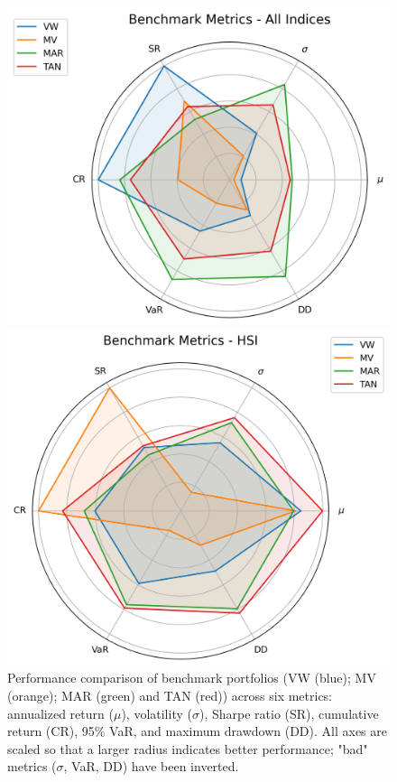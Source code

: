 \begin{figure}[H]
\begin{center}
\begin{minipage}{0.48\textwidth}
  \centering
  \includegraphics[width=\textwidth]{images/40_1.png}
\end{minipage}
\hfill
\begin{minipage}{0.48\textwidth}
  \centering
  \includegraphics[width=\textwidth]{images/40_2.png}
\end{minipage}
\caption[Benchmark performance - Radar]{Performance comparison of benchmark portfolios (VW (blue); MV (orange); MAR (green) and TAN (red)) across six metrics: annualized return ($\mu$), volatility ($\sigma$), Sharpe ratio (SR), cumulative return (CR), 95\% VaR, and maximum drawdown (DD). All axes are scaled so that a larger radius indicates better performance; "bad" metrics ($\sigma$, VaR, DD) have been inverted.}
\label{fig:combined2}
\end{center}
\end{figure}


